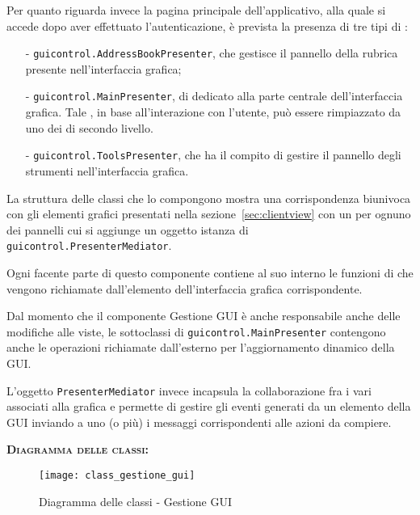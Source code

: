 \begin{description}
Per quanto riguarda invece la pagina principale dell'applicativo, alla quale si accede dopo aver effettuato l'autenticazione, è prevista la presenza di tre tipi di :
\begin{itemize}[noitemsep,nolistsep]
  \item[-] \texttt{guicontrol.AddressBookPresenter}, che gestisce il pannello della rubrica presente nell'interfaccia grafica;
  \item[-] \texttt{guicontrol.MainPresenter},  di  dedicato alla parte centrale dell'interfaccia grafica. Tale , in base all'interazione con l'utente, può essere rimpiazzato da uno dei  di secondo livello.
  \item[-] \texttt{guicontrol.ToolsPresenter}, che ha il compito di gestire il pannello degli strumenti nell'interfaccia grafica.
\end{itemize}

La struttura delle classi che lo compongono mostra una corrispondenza biunivoca con gli elementi grafici presentati nella sezione~\ref{sec:clientview} con un  per ognuno dei pannelli cui si aggiunge un oggetto istanza di \texttt{guicontrol.PresenterMediator}.

Ogni  facente parte di questo componente contiene al suo interno le funzioni di  che vengono richiamate dall'elemento dell'interfaccia grafica corrispondente.


Dal momento che il componente \textsf{Gestione GUI} è anche responsabile anche delle modifiche alle viste, le sottoclassi di \texttt{guicontrol.MainPresenter} contengono anche le operazioni richiamate dall'esterno per l'aggiornamento dinamico della GUI\@.


L'oggetto \texttt{PresenterMediator} invece incapsula la collaborazione fra i vari  associati alla grafica e permette di gestire gli eventi generati da un elemento della GUI inviando a uno (o più)  i messaggi corrispondenti alle azioni da compiere.

	\item{\scshape\bfseries Diagramma delle classi:}\\
  \begin{figure}[H]
    \centering
    \texttt{[image: class\_gestione\_gui]}
    \caption{Diagramma delle classi - Gestione GUI}\label{fig:gestionegui}
  \end{figure}


\end{description}
